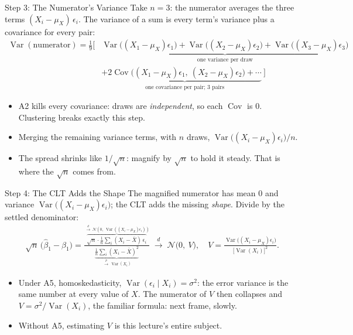 \documentclass[aspectratio=169,11pt,xcolor=dvipsnames]{beamer}
\DeclareMathOperator{\Cov}{Cov}
\DeclareMathOperator{\Var}{Var}
\newcommand{\dto}{\overset{d}{\longrightarrow}}
\newcommand{\pto}{\overset{p}{\longrightarrow}}
\begin{document}
\begin{frame}{Step 3: The Numerator's Variance}
Take $n = 3$: the numerator averages the three terms
$(X_i-\mu_X)\,\epsilon_i$. The variance of a sum is every term's variance
plus a covariance for every pair:
\begingroup\small
\setlength{\abovedisplayskip}{3pt}\setlength{\belowdisplayskip}{3pt}
\begin{align*}
  \Var(\text{numerator})
  = \tfrac19\Big[
  &\underbrace{\Var\big((X_1-\mu_X)\epsilon_1\big)
    + \Var\big((X_2-\mu_X)\epsilon_2\big)
    + \Var\big((X_3-\mu_X)\epsilon_3\big)}
    _{\text{one variance per draw}} \\
  &+ \underbrace{2\Cov\big((X_1-\mu_X)\epsilon_1,\ (X_2-\mu_X)\epsilon_2\big)
    + \cdots}
    _{\text{one covariance per pair; $3$ pairs}}\ \Big]
\end{align*}
\endgroup
\vskip-2pt
\begin{itemize}\itemsep0pt
  \item A2 kills every covariance: draws are \emph{independent},
        so each $\Cov$ is $0$. Clustering breaks exactly this step.
  \item Merging the remaining variance terms, with $n$ draws,
        $\Var\big((X_i-\mu_X)\epsilon_i\big)/n$.
  \item The spread shrinks like $1/\sqrt n$: \alert{magnify by $\sqrt n$} to
        hold it steady. That is where the $\sqrt n$ comes from.
\end{itemize}
\end{frame}

\begin{frame}{Step 4: The CLT Adds the Shape}
The magnified numerator has mean $0$ and variance
$\Var\big((X_i-\mu_X)\epsilon_i\big)$; the CLT adds the missing \emph{shape}.
Divide by the settled denominator:
\begingroup
\setlength{\abovedisplayskip}{2pt}\setlength{\belowdisplayskip}{2pt}
\begin{align*}
  \sqrt n\,\big(\hat\beta_1 - \beta_1\big)
  = \frac{\overbrace{\sqrt n\cdot\tfrac1n\sum_i (X_i-\bar X)\,\epsilon_i}
          ^{\ \dto\ \mathcal N\left(0,\ \Var\left((X_i-\mu_X)\epsilon_i\right)\right)}}
         {\underbrace{\tfrac1n\sum_i (X_i-\bar X)^2}_{\ \pto\ \Var(X_i)}}
  \;\dto\;
  \mathcal N\big(0,\ V\big) ,
  \quad
  V = \frac{\Var\big((X_i-\mu_X)\epsilon_i\big)}{\big[\Var(X_i)\big]^2} .
\end{align*}
\endgroup
\vskip-2pt
\begin{itemize}\itemsep0pt
  \item Under A5, homoskedasticity, $\Var(\epsilon_i \mid X_i) = \sigma^2$:
        the error variance is the same number at every value of $X$. The
        numerator of $V$ then collapses and $V = \sigma^2/\Var(X_i)$, the
        familiar formula: next frame, slowly.
  \item Without A5, \alert{estimating $V$ is this lecture's entire subject}.
\end{itemize}
\end{frame}
\end{document}
